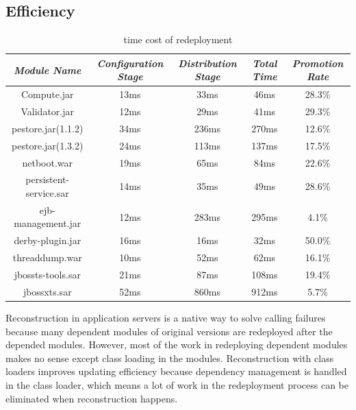 \documentclass[conference]{IEEEtran}
\begin{document}
\subsection{Efficiency}


\begin{table}
\centering
\caption{time cost of redeployment}
\label{tab:stage}
\begin{tabular}{|c|c|c|c|c|}
\hline
\emph{Module Name}	&	\emph{Configuration Stage}	&	\emph{Distribution Stage}	&	\emph{Total Time}	&	\emph{Promotion Rate}\\
\hline
\hline
Compute.jar		&	13ms			&	33ms			&	46ms			&	28.3\%\\
\hline
Validator.jar		&	12ms			&	29ms			&	41ms			&	29.3\%\\
\hline
pestore.jar(1.1.2)	&	34ms			&	236ms			&	270ms			&	12.6\%\\
\hline
pestore.jar(1.3.2)	&	24ms			&	113ms			&	137ms			&	17.5\%\\
\hline
netboot.war		&	19ms		 	&	65ms			&	84ms			&	22.6\%\\
\hline
persistent-service.sar 	& 	14ms 			&	35ms			&	49ms			&	28.6\%\\
\hline
ejb-management.jar	& 	12ms		 	&	283ms			&	295ms			&	4.1\%\\
\hline
derby-plugin.jar	&	16ms			&	16ms			&	32ms			&	50.0\%\\
\hline
threaddump.war		&	10ms			&	52ms			&	62ms			&	16.1\%\\
\hline
jbossts-tools.sar	&	21ms			&	87ms			&	108ms			&	19.4\%\\
\hline
jbossxts.sar		&	52ms			&	860ms			&	912ms			&	5.7\%\\
\hline
\end{tabular}
\end{table}


Reconstruction in application servers is a native way to solve calling failures because many dependent modules of original versions are redeployed after the depended modules.
However, most of the work in redeploying dependent modules makes no sense except class loading in the modules.
Reconstruction with class loaders improves updating efficiency because dependency management is handled in the class loader, which means a lot of work in the redeployment process can be eliminated when reconstruction happens.
\end{document}
